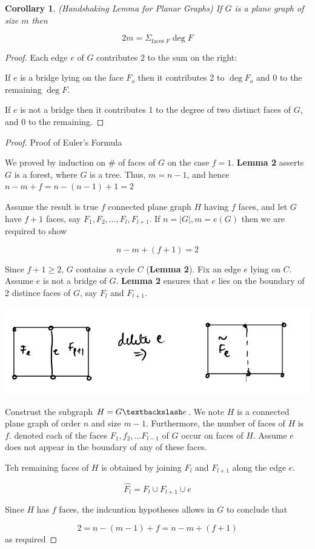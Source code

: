 \documentclass[12pt]{article}
\newtheorem*{corollary}{Corollary}
\newenvironment{pro}{\begin{proof}}{\end{proof}}
\begin{document}
\begin{corollary}

	(Handshaking Lemma for Planar Graphs)
	If $G$ is a plane graph of size $m$ then

	\[2m = \Sigma_{\text{faces } F} \deg  F\]
\end{corollary}

\begin{pro}
	Each edge $e$ of $G$ contributes 2 to the sum on the right:

	If $e$ is a bridge lying on the face $F_{o}$ then it contributes 2 to $\deg F_{o}$ and 0 to the remaining $\deg F$.


	If $e$ is not a bridge then it contributes 1 to the degree of two distinct faces of $G$, and 0 to the remaining.
\end{pro}


\begin{pro}

	Proof of Euler's Formula

	We proved by induction on $\#$ of faces of $G$ on the case $f=1$. \textbf{Lemma 2} asserts $G$ is a forest, where $G$ is a tree.
	Thus, $m=n-1$, and hence $n-m +f = n-(n-1)+1 = 2$

	Assume the result is true $f$ connected plane graph $H$ having $f$ faces, and let $G$ have $f+1$ faces, say $F_{1}, F_{2}, \dots, F_{l}, F_{l+1}$.
	If $n = \vert G\vert, m = e(G)$ then we are required to show

	\[n-m +(f+1) = 2\]

	Since $f+1\ge 2$, $G$ contains a cycle $C$ (\textbf{Lemma 2}). Fix an edge $e$ lying on $C$. Assume $e$ is not a bridge of $G$. \textbf{Lemma 2} ensures that $e$ lies on the boundary of 2 distince faces of $G$, say $F_{l}$ and $F_{l+1}$.
	\begin{center}
		\includegraphics[scale=0.5]{eulerproof}
	\end{center}


	Construst the subgraph $H=G\textbackslash e$. We note $H$ is a connected plane graph of order $n$ and size $m-1$.
	Furthermore, the number of faces of $H$ is $f$. denoted each of the faces $F_{1}, f_{2},\dots F_{l-1}$ of $G$ occur on faces of $H$. Assume $e$ does not appear in the boundary of any of these faces.

	Teh remaining faces of $H$ is obtained by joining $F_{l}$ and $F_{l+1}$ along the edge $e$.

	\[\hat{F_{l}} = F_{l} \cup F_{l+1} \cup e\]

	Since $H$ has $f$ faces, the indcuntion hypotheses allows in $G$ to conclude that

	\[ 2 = n- (m-1) + f = n - m + (f+1)\]
	as required

\end{pro}
\end{document}
